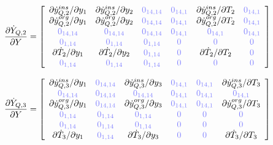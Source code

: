 \documentclass[a4paper,10pt]{article}
\begin{document}
\begin{equation}
\frac{\partial\dot{Y}_{Q,2}}{\partial Y}=
\left[ \begin{array}{cccccc}
\partial\dot{y}_{Q,2}^{ins} / \partial y_1 & \partial\dot{y}_{Q,2}^{ins} / \partial y_2 & \zm{14,14} & \zm{14,1} & \partial\dot{y}_{Q,2}^{ins} / \partial T_2 & \zm{14,1} \\
\partial\dot{y}_{Q,2}^{org} / \partial y_1 & \partial\dot{y}_{Q,2}^{org} / \partial y_2 & \zm{14,14} & \zm{14,1} & \partial\dot{y}_{Q,2}^{org} / \partial T_2 & \zm{14,1} \\
\zm{14,14}                                 & \zm{14,14}                                 & \zm{14,14} & \zm{14,1} & \zm{14,1}                                  & \zm{14,1} \\
\zm{1,14}                                  & \zm{1,14}                                  & \zm{1,14}  & \zm{}     & \zm{}                                      & \zm{} \\
\partial\dot{T}_2 / \partial y_1           & \partial\dot{T}_2 / \partial y_2           & \zm{1,14}  & \zm{}     & \partial\dot{T}_2 / \partial T_2           & \zm{} \\
\zm{1,14}                                  & \zm{1,14}                                  & \zm{1,14}  & \zm{}     & \zm{}                                      & \zm{} \\
\end{array}  \right]
\end{equation}

\begin{equation}
\frac{\partial\dot{Y}_{Q,3}}{\partial Y}=
\left[ \begin{array}{cccccc}
\partial\dot{y}_{Q,3}^{ins} / \partial y_1 & \zm{14,14} & \partial\dot{y}_{Q,3}^{ins} / \partial y_3 & \zm{14,1} & \zm{14,1} & \partial\dot{y}_{Q,3}^{ins} / \partial T_3  \\
\zm{14,14}                                 & \zm{14,14} & \zm{14,14}                                 & \zm{14,1} & \zm{14,1} & \zm{14,1} \\
\partial\dot{y}_{Q,3}^{org} / \partial y_1 & \zm{14,14} & \partial\dot{y}_{Q,3}^{org} / \partial y_3 & \zm{14,1} & \zm{14,1} & \partial\dot{y}_{Q,3}^{org} / \partial T_3  \\
\zm{1,14}                                  & \zm{1,14}  & \zm{1,14}                                  & \zm{}     & \zm{}     & \zm{} \\
\zm{1,14}                                  & \zm{1,14}  & \zm{1,14}                                  & \zm{}     & \zm{}     & \zm{} \\
\partial\dot{T}_3 / \partial y_1           & \zm{1,14}  & \partial\dot{T}_3 / \partial y_3           & \zm{}     & \zm{}     & \partial\dot{T}_3 / \partial T_3 \\
\end{array}  \right]
\end{equation}
\end{document}
